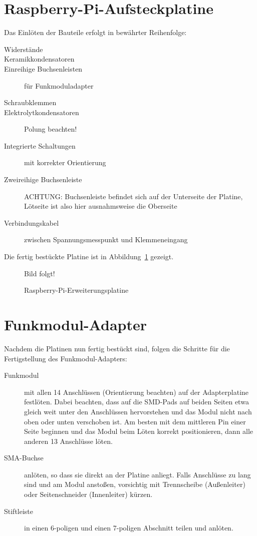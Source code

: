 \documentclass[paper=a4, parskip, numbers=noenddot, toc=listof, headsepline]{scrbook}
\begin{document}
		 \section{Raspberry-Pi-Aufsteckplatine}

		  Das Einlöten der Bauteile erfolgt in bewährter Reihenfolge:
		  \begin{description}
			  \item[Widerstände]
			  \item[Keramikkondensatoren]
			  \item[Einreihige Buchsenleisten] für Funkmoduladapter
			  \item[Schraubklemmen]
			  \item[Elektrolytkondensatoren] Polung beachten!
			  \item[Integrierte Schaltungen] mit korrekter Orientierung
			  \item[Zweireihige Buchsenleiste] ACHTUNG: Buchsenleiste befindet sich auf der Unterseite der Platine, Lötseite ist also hier ausnahmsweise die Oberseite
			  \item[Verbindungskabel] zwischen Spannungsmesspunkt und Klemmeneingang
		  \end{description}

		  Die fertig bestückte Platine ist in Abbildung~\ref{fig:raspiextension} gezeigt.

		  \begin{figure}
			  \centering
			  {\LARGE Bild folgt!}
			  \caption{Raspberry-Pi-Erweiterungsplatine}
			  \label{fig:raspiextension}
		  \end{figure}

		 \section{Funkmodul-Adapter}

		  Nachdem die Platinen nun fertig bestückt sind, folgen die Schritte für die Fertigstellung des Funkmodul-Adapters:
		  \begin{description}
			  \item[Funkmodul] mit allen 14 Anschlüssen (Orientierung beachten) auf der Adapterplatine festlöten. Dabei beachten, dass auf die SMD-Pads auf beiden Seiten etwa gleich weit unter den Anschlüssen hervorstehen und das Modul nicht nach oben oder unten verschoben ist. Am besten mit dem mittleren Pin einer Seite beginnen und das Modul beim Löten korrekt positionieren, dann alle anderen 13 Anschlüsse löten.
			  \item[SMA-Buchse] anlöten, so dass sie direkt an der Platine anliegt. Falls Anschlüsse zu lang sind und am Modul anstoßen, vorsichtig mit Trennscheibe (Außenleiter) oder Seitenschneider (Innenleiter) kürzen.
			  \item[Stiftleiste] in einen 6-poligen und einen 7-poligen Abschnitt teilen und anlöten.
		  \end{description}
\end{document}
